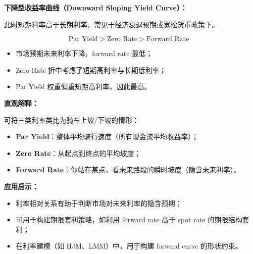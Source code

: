 \textbf{下降型收益率曲线（Downward Sloping Yield Curve）：}

此时短期利率高于长期利率，常见于经济衰退预期或宽松货币政策下。

\begin{equation}
\text{Par Yield} > \text{Zero Rate} > \text{Forward Rate}
\end{equation}

\begin{itemize}
    \item 市场预期未来利率下降，forward rate 最低；
    \item Zero Rate 折中考虑了短期高利率与长期低利率；
    \item Par Yield 权重偏重短期高利率，因此最高。
\end{itemize}

\textbf{直观解释：}

可将三类利率类比为骑车上坡/下坡的情形：

\begin{itemize}
    \item \textbf{Par Yield}：整体平均骑行速度（所有现金流平均收益率）；
    \item \textbf{Zero Rate}：从起点到终点的平均坡度；
    \item \textbf{Forward Rate}：你站在某点，看未来路段的瞬时坡度（隐含未来利率）。
\end{itemize}

\textbf{应用启示：}

\begin{itemize}
    \item 利率相对关系有助于判断市场对未来利率的隐含预期；
    \item 可用于构建期限套利策略，如利用 forward rate 高于 spot rate 的期限结构套利；
    \item 在利率建模（如 HJM、LMM）中，用于构建 forward curve 的形状约束。
\end{itemize}
